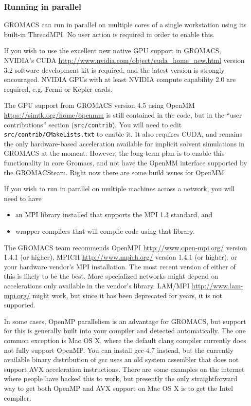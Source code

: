 \documentclass{article}[12pt,a4paper,twoside]
\newcommand{\gromacs}{GROMACS}
\newcommand{\nvidia}{NVIDIA}
\newcommand{\cuda}{CUDA}
\newcommand{\mpi}{MPI}
\newcommand{\threadmpi}{ThreadMPI}
\newcommand{\openmpi}{OpenMPI}
\newcommand{\openmp}{OpenMP}
\newcommand{\openmm}{OpenMM}
\newcommand{\lammpi}{LAM/MPI}
\newcommand{\mpich}{MPICH}
\newcommand{\cudaversion}{3.2}
\begin{document}
\subsubsection{Running in parallel}

\gromacs{} can run in parallel on multiple cores of a single
workstation using its built-in \threadmpi. No user action is required
in order to enable this.

If you wish to use the excellent new native GPU support in \gromacs,
\nvidia{}'s \cuda{}
\url{http://www.nvidia.com/object/cuda_home_new.html} version
\cudaversion{} software development kit is required, and the latest
version is strongly encouraged. \nvidia{} GPUs with at least \nvidia{} compute
capability 2.0 are required, e.g. Fermi or Kepler cards.

The GPU support from \gromacs{} version 4.5 using \openmm{}
\url{https://simtk.org/home/openmm} is still contained in the code,
but in the ``user contributions'' section (\verb+src/contrib+). You
will need to edit \verb+src/contrib/CMakeLists.txt+ to enable it. It
also requires \cuda{}, and remains the only hardware-based
acceleration available for implicit solvent simulations in
\gromacs{} at the moment. However, the long-term plan is to enable 
this functionality in core Gromacs, and not have the OpenMM
interface supported by the \gromacs team. Right now there are
some build issues for OpenMM.

If you wish to run in parallel on multiple machines across a network,
you will need to have
\begin{itemize}
\item an \mpi{} library installed that supports the \mpi{} 1.3
  standard, and
\item wrapper compilers that will compile code using that library.
\end{itemize}
The \gromacs{} team recommends \openmpi{}
\url{http://www.open-mpi.org/} version 1.4.1 (or higher), \mpich{}
\url{http://www.mpich.org/} version 1.4.1 (or higher), or your
hardware vendor's \mpi{} installation. The most recent version of
either of this is likely to be the best. More specialized networks
might depend on accelerations only available in the vendor's library.
 \lammpi{}
\url{http://www.lam-mpi.org/} might work, but since it has been
deprecated for years, it is not supported.

In some cases, \openmp{} parallelism is an advantage for \gromacs{},
but support for this is generally built into your compiler and detected
automatically. The one common exception is Mac OS X, where the default
clang compiler currently does not fully support OpenMP. You can install
gcc-4.7 instead, but the currently available binary distribution of gcc 
uses an old system assembler that does not support AVX acceleration
instructions. There are some examples on the internet where people have
hacked this to work, but presently the only straightforward way to get
both OpenMP and AVX support on Mac OS X is to get the Intel compiler.
\end{document}
